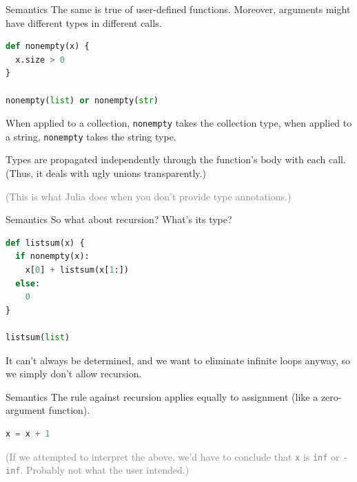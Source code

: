 \documentclass{beamer}
\begin{document}
\begin{frame}[fragile]{Semantics}
\vspace{0.5 cm}
The same is true of user-defined functions. Moreover, arguments might have different types in different calls.

\begin{center}
\begin{minipage}{0.9\linewidth}
\small
\begin{lstlisting}[language=python]
def nonempty(x) {
  x.size > 0
}

nonempty(list) or nonempty(str)
\end{lstlisting}
\end{minipage}
\end{center}

When applied to a collection, {\small\tt nonempty} takes the collection type, when applied to a string, {\small\tt nonempty} takes the string type.

\vspace{0.5 cm}
Types are propagated independently through the function's body with each call. (Thus, it deals with ugly unions transparently.)

\vspace{0.5 cm}
\textcolor{gray}{(This is what Julia does when you don't provide type annotations.)}
\end{frame}

\begin{frame}[fragile]{Semantics}
So what about recursion? What's its type?

\begin{center}
\begin{minipage}{0.9\linewidth}
\small
\begin{lstlisting}[language=python]
def listsum(x) {
  if nonempty(x):
    x[0] + listsum(x[1:])
  else:
    0
}

listsum(list)
\end{lstlisting}
\end{minipage}
\end{center}

It can't always be determined, and we want to eliminate infinite loops anyway, so we simply don't allow recursion.
\end{frame}

\begin{frame}[fragile]{Semantics}
The rule against recursion applies equally to assignment (like a zero-argument function).

\begin{center}
\begin{minipage}{0.9\linewidth}
\small
\begin{lstlisting}[language=python]
x = x + 1
\end{lstlisting}
\end{minipage}
\end{center}

\textcolor{gray}{(If we attempted to interpret the above, we'd have to conclude that {\tt x} is {\tt inf} or {\tt -inf}. Probably not what the user intended.)}
\end{frame}
\end{document}
